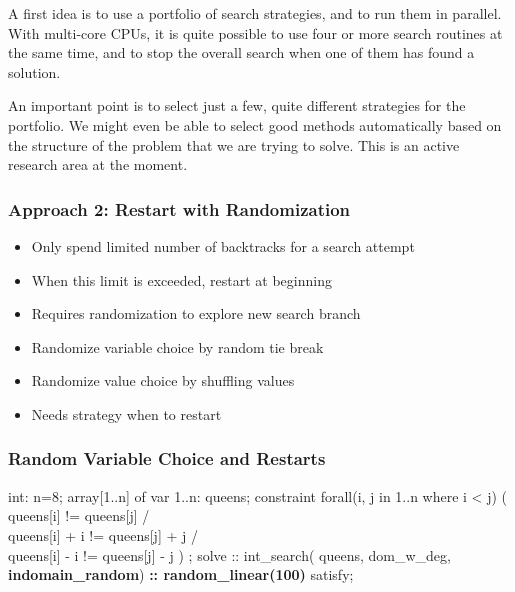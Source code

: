A first idea is to use a portfolio of search strategies, and to run them in parallel. With multi-core CPUs, it is quite possible to use four or more search routines at the same time, and to stop the overall search when one of them has found a solution.

An important point is to select just a few, quite different strategies for the portfolio. We might even be able to select good methods automatically based on the structure of the problem that we are trying to solve. This is an active research area at the moment.

\begin{frame}
\frametitle{Approach 2: Restart with Randomization}
\begin{itemize}
\item Only spend limited number of backtracks for a search attempt
\item When this limit is exceeded, restart at beginning
\item Requires randomization to explore new search branch
\item Randomize variable choice by random tie break
\item Randomize value choice by shuffling values
\item Needs strategy when to restart
\end{itemize}
\end{frame}

\begin{frame}[fragile]
  \frametitle{Random Variable Choice and Restarts}
  \begin{semiverbatim}
int: n=8;
array[1..n] of var 1..n: queens;
constraint
    forall(i, j in 1..n where i < j) (
         queens[i] != queens[j] /\\
         queens[i] + i != queens[j] + j /\\
         queens[i] - i != queens[j] - j
    )
 ;
solve :: int\_search(
        queens,
        dom\_w\_deg,
        \textbf{indomain\_random})
        \textbf{:: random\_linear(100)}
        satisfy;       
  \end{semiverbatim}
\end{frame}




